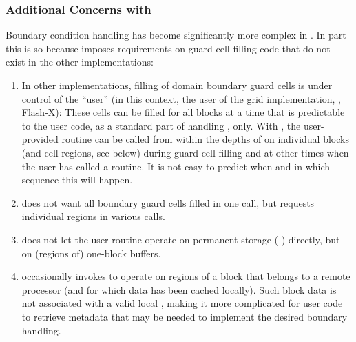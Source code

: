 \subsubsection{Additional Concerns with }
Boundary condition handling has become significantly more complex in \flashx.
In part this is so because  imposes requirements on
guard cell filling code that do not exist in the other 
implementations:
\begin{enumerate}
\item In other  implementations, filling of domain boundary guard cells
is under control of the ``user'' (in this context, the user of the grid implementation,
\ie, Flash-X): These cells can be filled for all blocks at a time that is predictable to the user
code, as a standard part of handling , only.
With , the user-provided  routine can be called
from within the depths of \Paramesh on individual blocks (and cell regions, see below)
during guard cell filling and at other times when the user has called a \Paramesh
routine. It is not easy to predict when and in which sequence this will happen.
\item {} does not want all boundary guard cells filled in one call,
but requests individual regions in various calls.
\item {} does not let the user routine  operate on 
permanent storage ( \etc) directly, but on (regions of) one-block
buffers.
\item {} occasionally invokes  to operate on 
regions of a block that belongs to a remote processor (and for which
data has been cached locally). Such block data is not associated with
a valid local , making it more complicated for user
code to retrieve metadata that may be needed to implement the
desired boundary handling.
\end{enumerate}

